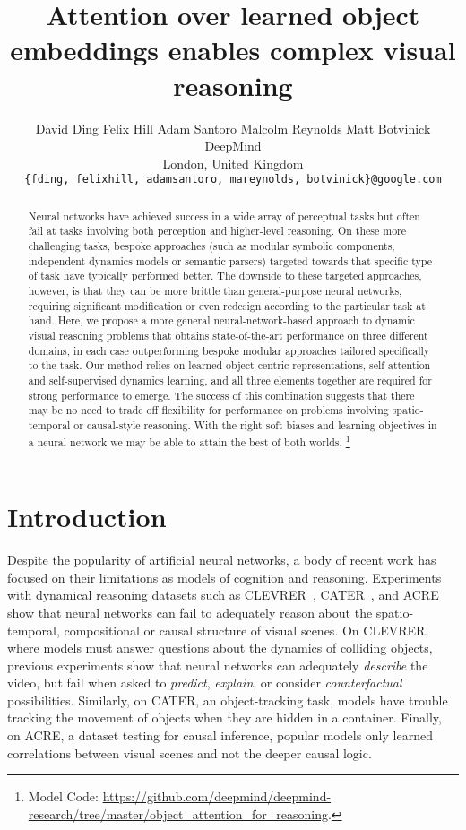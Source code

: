\documentclass{article}
\title{Attention over learned object embeddings enables complex visual reasoning}
\author{David Ding 
\qquad
Felix Hill
\qquad
Adam Santoro
\qquad
Malcolm Reynolds
\qquad
Matt Botvinick\\
{DeepMind} \\
{London, United Kingdom }\\
\texttt{\{fding, felixhill, adamsantoro, mareynolds, botvinick\}@google.com}
}
\newcommand\blfootnote[1]{\begingroup
  \renewcommand\thefootnote{}\footnote{#1}\addtocounter{footnote}{-1}\endgroup
}
\begin{document}
\maketitle

\begin{abstract}

Neural networks have achieved success in a wide array of perceptual tasks
but often fail at tasks involving both perception and higher-level reasoning.
On these more challenging tasks,
bespoke approaches (such as modular symbolic components, independent dynamics models or semantic parsers) targeted towards that specific type of task
 have typically performed better.
The downside to these targeted approaches, however, is that they can be more brittle than general-purpose neural networks, requiring significant modification or even redesign according to the particular task at hand.
Here, we propose a more general neural-network-based approach to dynamic visual reasoning problems that obtains state-of-the-art performance on three different domains, in each case outperforming bespoke modular approaches tailored specifically to the task. Our method relies on learned object-centric representations, self-attention and self-supervised dynamics learning, and all three elements together are required for strong performance to emerge. The success of this combination suggests that there may be no need to trade off flexibility for performance on problems involving spatio-temporal or causal-style reasoning. With the right soft biases and learning objectives in a neural network we may be able to attain the best of both worlds. \blfootnote{Model Code: \url{https://github.com/deepmind/deepmind-research/tree/master/object_attention_for_reasoning}.}

\end{abstract}



\section{Introduction}


Despite the popularity of artificial neural networks, a body of recent work has focused on their limitations as models of cognition and reasoning. Experiments with dynamical reasoning datasets such as CLEVRER~\citep{clevrer}, CATER~\citep{cater}, and ACRE~\citep{acre} show that neural networks can fail to adequately reason about the spatio-temporal, compositional or causal structure of visual scenes.
On CLEVRER, where models must answer questions about the dynamics of colliding objects, previous experiments show that neural networks can adequately \emph{describe} the video, but fail when asked to \emph{predict}, \emph{explain}, or consider \emph{counterfactual} possibilities. Similarly, on CATER, an object-tracking task, models have trouble tracking the movement of objects when they are hidden in a container. Finally, on ACRE, a dataset testing for  causal inference, popular models only learned correlations between visual scenes and not the deeper causal logic.
\end{document}
